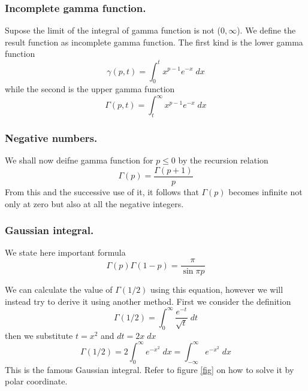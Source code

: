 \documentclass[../../main.tex]{subfiles}
\begin{document}
\subsubsection*{Incomplete gamma function.} Supose the limit of the integral of gamma function is not ($0,\infty$). We define the result function as incomplete gamma function. The first kind is the lower gamma function 
\begin{equation*}
    \gamma (p,t)=\int_{0}^{t}x^{p-1}e^{-x}\;dx
\end{equation*}
while the second is the upper gamma function
\begin{equation*}
    \Gamma (p,t)=\int_{t }^{\infty}x^{p-1}e^{-x}\;dx
\end{equation*}

\subsubsection*{Negative numbers.} We shall now deifne gamma function for $p\leq 0$ by the recursion 
relation 
\begin{equation*}
    \Gamma(p)=\frac{\Gamma(p+1)}{p}
\end{equation*}
From this and the successive use of it, it follows that $\Gamma(p)$ becomes infinite not only at zero but also at all the negative integers.

\subsubsection*{Gaussian integral.} We state here important formula
\begin{equation*}
    \Gamma(p)\Gamma(1-p)=\frac{\pi}{\sin \pi p}
\end{equation*}

We can calculate the value of $\Gamma(1/2)$ using this equation, however we will instead try to derive it using another method. First we consider the definition
\begin{equation*}
    \Gamma(1/2)=\int_{0}^{\infty}\frac{e^{-t}}{\sqrt{t}}\;dt
\end{equation*}
then we substitute $t=x^2$ and $dt=2x\;dx$
\begin{equation*}
    \Gamma(1/2)=2\int_{0}^{\infty}e^{-x^2}\;dx=\int_{-\infty}^{\infty}e^{-x^2}\;dx
\end{equation*}
This is the famous Gaussian integral. Refer to figure \ref{fig} on how to solve it by polar coordinate. 
\end{document}
